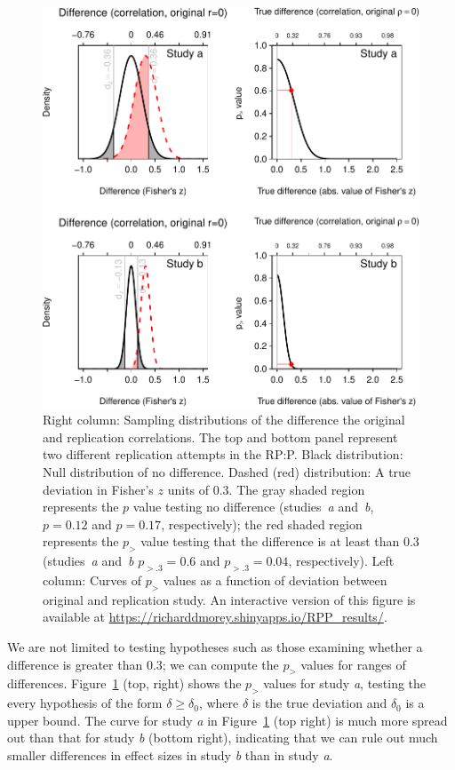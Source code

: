 \documentclass[doc,a4paper,floatsintext,draftfirst]{apa6}
\makeatletter
\def\maxwidth{ %
  \ifdim\Gin@nat@width>\linewidth
    \linewidth
  \else
    \Gin@nat@width
  \fi
}
\makeatother
\begin{document}
\begin{figure}
\includegraphics[width=.9\maxwidth]{figure/severity1-1} 
\vspace{.1in}
\caption[Sampling distributions of test statistic ]{Right column: Sampling distributions of the difference the original and replication correlations. The top and bottom panel represent two different replication attempts in the RP:P. Black distribution: Null distribution of no difference. Dashed (red) distribution: A true deviation in Fisher's $z$ units of 0.3. The gray shaded region represents the $p$ value testing no difference (studies~{\em a} and~{\em b}, $p=0.12$ and $p=0.17$, respectively); the red shaded region represents the $p_{>}$ value testing that the difference is at least than 0.3 (studies~{\em a} and~{\em b} $p_{>.3}=0.6$ and $p_{>.3}=0.04$, respectively). Left column: Curves of $p_{>}$ values as a function of deviation between original and replication study. An interactive version of this figure is available at \protect\url{https://richarddmorey.shinyapps.io/RPP_results/}.}\label{fig:pv_curve}
\end{figure}

We are not limited to testing hypotheses such as those examining whether a difference is greater than 0.3; we can compute the $p_{>}$ values for ranges of differences. Figure~\ref{fig:pv_curve} (top, right) shows the $p_{>}$ values for study {\em a}, testing the every hypothesis of the form $\delta\geq \delta_0$, where $\delta$ is the true deviation and $\delta_0$ is a upper bound. The curve for study {\em a} in Figure~\ref{fig:pv_curve} (top right) is much more spread out than that for study {\em b} (bottom right), indicating that we can rule out much smaller differences in effect sizes in study {\em b} than in study {\em a}.
\end{document}
